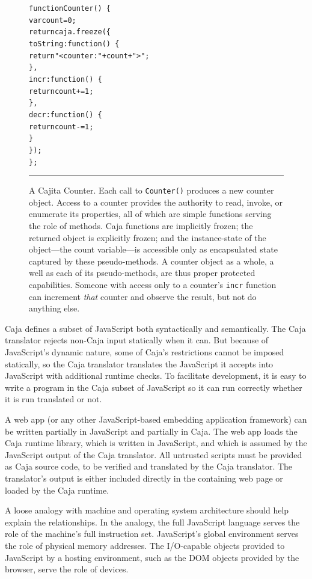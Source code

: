 \documentclass[letterpaper,twocolumn,10pt]{article}
\newcommand{\code}[1]{{\tt {#1}}}              %
\begin{document}
\begin{figure}[t!]
\begin{alltt}
function Counter()\ \{
  var count = 0;
  return caja.freeze(\{
    toString: function()\ \{ 
      return "<counter: " + count + ">"; 
    \},
    incr: function()\ \{ 
      return count += 1; 
    \},
    decr: function()\ \{ 
      return count -= 1; 
    \}
  \});
\};
\end{alltt}

\caption[A Cajita Counter.]{A Cajita Counter. Each call to \code{Counter()} 
produces a new counter object. Access to a counter provides the authority 
to read, invoke, or enumerate its properties, all of which are simple 
functions serving the role of methods. Caja functions are implicitly frozen; 
the returned object is explicitly frozen; and the instance-state of the 
object---the count variable---is accessible only as encapsulated state 
captured by these pseudo-methods. A counter object as a whole, a well as each 
of its pseudo-methods, are thus proper protected capabilities. Someone with 
access only to a counter's \code{incr} function can increment \emph{that} 
counter and observe the result, but not do anything else. \\ } \hrule
\label{fig:cajita-counter}
\end{figure}

Caja defines a subset of JavaScript both syntactically and semantically. The 
Caja translator rejects non-Caja input statically when it can. But because of 
JavaScript's dynamic nature, some of Caja's restrictions cannot be imposed 
statically, so the Caja translator translates the JavaScript it accepts into 
JavaScript with additional runtime checks. To facilitate development, it is 
easy to write a program in the Caja subset of JavaScript so it can run 
correctly whether it is run translated or not.

A web app (or any other JavaScript-based embedding application framework) can 
be written partially in JavaScript and partially in Caja. The web app loads 
the Caja runtime library, which is written in JavaScript, and which is 
assumed by the JavaScript output of the Caja translator. All untrusted 
scripts must be provided as Caja source code, to be verified and translated 
by the Caja translator. The translator's output is either included directly 
in the containing web page or loaded by the Caja runtime.

A loose analogy with machine and operating system architecture should help 
explain the relationships. In the analogy, the full JavaScript language 
serves the role of the machine's full instruction set. JavaScript's global 
environment serves the role of physical memory addresses. The I/O-capable 
objects provided to JavaScript by a hosting environment, such as the DOM 
objects provided by the browser, serve the role of devices.
\end{document}
